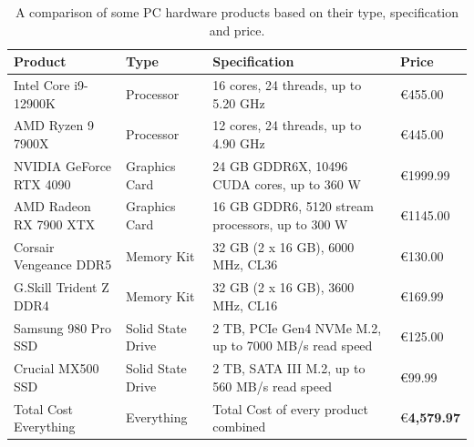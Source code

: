 \documentclass[12pt]{article}
\begin{document}
\begin{table}
    \begin{adjustbox}{width=\textheight,keepaspectratio}
        \begin{tabularx}{\textwidth}{@{}lLLl@{}}
            \toprule
            \textbf{Product}        & \textbf{Type}     & \textbf{Specification}                                              & \textbf{Price}          \\
            \midrule
            Intel Core i9-12900K    & Processor         & 16 cores, 24 threads, up to 5.20 GHz \cite{intel}                   & \euro 455.00            \\
            AMD Ryzen 9 7900X       & Processor         & 12 cores, 24 threads, up to 4.90 GHz \cite{amd1}                    & \euro 445.00            \\
            NVIDIA GeForce RTX 4090 & Graphics Card     & 24 GB GDDR6X, 10496 CUDA cores, up to 360 W \cite{nvidia}           & \euro 1999.99           \\
            AMD Radeon RX 7900 XTX  & Graphics Card     & 16 GB GDDR6, 5120 stream processors, up to 300 W \cite{amd2}        & \euro 1145.00           \\
            Corsair Vengeance DDR5  & Memory Kit        & 32 GB (2 x 16 GB), 6000 MHz, CL36 \cite{corsair}                    & \euro 130.00            \\
            G.Skill Trident Z DDR4  & Memory Kit        & 32 GB (2 x 16 GB), 3600 MHz, CL16 \cite{gskill}                     & \euro 169.99            \\
            Samsung 980 Pro SSD     & Solid State Drive & 2 TB, PCIe Gen4 NVMe M.2, up to 7000 MB/s read speed \cite{samsung} & \euro 125.00            \\
            Crucial MX500 SSD       & Solid State Drive & 2 TB, SATA III M.2, up to 560 MB/s read speed \cite{crucial}        & \euro 99.99             \\
            Total Cost Everything   & Everything        & Total Cost of every product combined                                & \euro \textbf{4,579.97} \\
            \bottomrule
        \end{tabularx}
    \end{adjustbox}
    \caption{A comparison of some PC hardware products based on their type, specification and price.}
    \label{tab:hardware}
\end{table}
\end{document}
